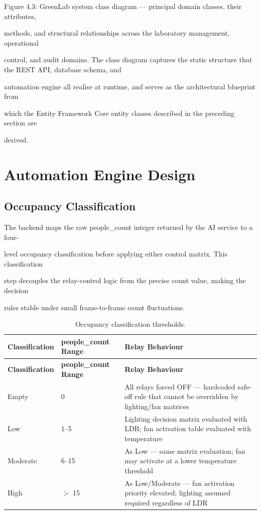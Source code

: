 Figure 4.3: GreenLab system class diagram --- principal domain classes, their attributes,

methods, and structural relationships across the laboratory management, operational

control, and audit domains.
The class diagram captures the static structure that the REST API, database schema, and

automation engine all realise at runtime, and serves as the architectural blueprint from

which the Entity Framework Core entity classes described in the preceding section are

derived.


\section{Automation Engine Design}

\subsection{Occupancy Classification}
The backend maps the raw people\_count integer returned by the AI service to a four-

level occupancy classification before applying either control matrix. This classification

step decouples the relay-control logic from the precise count value, making the decision

rules stable under small frame-to-frame count fluctuations.

\begin{longtable}{|L{3.2cm}|L{2.4cm}|L{6.8cm}|}
\caption{Occupancy classification thresholds.} \label{tab:4-5} \\
\hline
{}
\textbf{Classification} & \textbf{people\_count Range} & \textbf{Relay Behaviour} \\
\hline
\endfirsthead
\hline
{}
\textbf{Classification} & \textbf{people\_count Range} & \textbf{Relay Behaviour} \\
\hline
\endhead
\hline
\endfoot
\hline
\endlastfoot
Empty & 0 & All relays forced OFF --- hardcoded safe-off rule that cannot be overridden by lighting/fan matrices \\
\hline
Low & 1--5 & Lighting decision matrix evaluated with LDR; fan activation table evaluated with temperature \\
\hline
Moderate & 6--15 & As Low --- same matrix evaluation; fan may activate at a lower temperature threshold \\
\hline
High & $>$ 15 & As Low/Moderate --- fan activation priority elevated; lighting assumed required regardless of LDR \\
\hline
\end{longtable}


